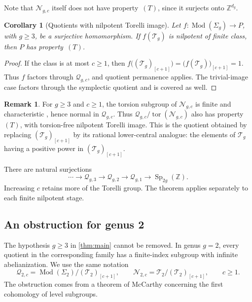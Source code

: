 \documentclass[11pt,a4paper]{article}
\newtheorem{corollary}[theorem]{Corollary}
\theoremstyle{definition}
\newtheorem{remark}[theorem]{Remark}
\newcommand{\Z}{\mathbb Z}
\newcommand{\Mod}{\operatorname{Mod}}
\newcommand{\Sp}{\operatorname{Sp}}
\newcommand{\tor}{\operatorname{tor}}
\newcommand{\rt}{(T)}
\begin{document}
Note that
\(\mathcal{N}_{g,c}\) itself does not have property~\(\rt\), since it
surjects onto \(\Z^{d_g}\). 

\begin{corollary}[Quotients with nilpotent Torelli image]
\label{cor:nilpotentimage}
Let \(f:\Mod(\Sigma_g)\to P\), with \(g\ge3\), be a
surjective homomorphism. If \(f(\mathcal{T}_g)\) is nilpotent of finite
class, then \(P\) has property~\(\rt\).
\end{corollary}
\begin{proof}
If the class is at most \(c\ge1\), then
\(f\bigl((\mathcal{T}_g)_{[c+1]}\bigr)
=\bigl(f(\mathcal{T}_g)\bigr)_{[c+1]}=1\).
Thus \(f\) factors through \(\mathcal{Q}_{g,c}\), and quotient
permanence applies. The trivial-image case factors through the
symplectic quotient and is covered as well.
\end{proof}

\begin{remark}
For \(g\ge3\) and \(c\ge1\), the torsion subgroup of
\(\mathcal{N}_{g,c}\) is finite and characteristic
\cite[Chapter~II]{Raghunathan}, hence normal in \(\mathcal{Q}_{g,c}\).
Thus \(\mathcal{Q}_{g,c}/\tor(\mathcal{N}_{g,c})\) also has
property~\(\rt\), with torsion-free nilpotent Torelli image.
This is the quotient obtained by replacing \((\mathcal{T}_g)_{[c+1]}\)
by its rational lower-central analogue: the elements of \(\mathcal{T}_g\)
having a positive power in \((\mathcal{T}_g)_{[c+1]}\).
\end{remark}

There are natural surjections
\[
 \cdots\longrightarrow \mathcal{Q}_{g,3}\longrightarrow \mathcal{Q}_{g,2}
 \longrightarrow \mathcal{Q}_{g,1}\longrightarrow\Sp_{2g}(\Z).
\]
Increasing \(c\) retains more of the Torelli group. The theorem
applies separately to each finite nilpotent stage.


\subsection{An obstruction for genus 2}
\label{sec:genustwo}

The hypothesis \(g\ge3\) in \cref{thm:main} cannot be removed.
In genus \(g=2\), every quotient in the corresponding family has a
finite-index subgroup with infinite abelianization. We use the same
notation
\[
 \mathcal{Q}_{2,c}=\Mod(\Sigma_2)/(\mathcal{T}_2)_{[c+1]},\qquad
 \mathcal{N}_{2,c}=\mathcal{T}_2/(\mathcal{T}_2)_{[c+1]},\qquad c\ge1.
\]
The obstruction comes from a theorem of McCarthy concerning the
first cohomology of level subgroups.
\end{document}

